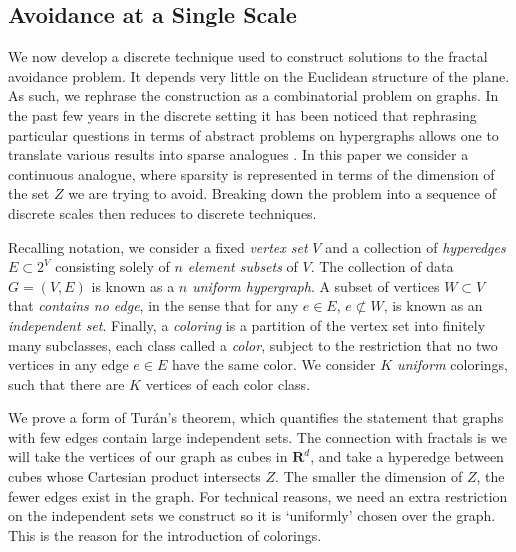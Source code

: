 \documentclass{article}
\theoremstyle{plain}
\theoremstyle{plain}
\begin{document}
\begin{multicols}{2}
\section{Avoidance at a Single Scale}

We now develop a discrete technique used to construct solutions to the fractal avoidance problem. It depends very little on the Euclidean structure of the plane. As such, we rephrase the construction as a combinatorial problem on graphs. In the past few years in the discrete setting it has been noticed that rephrasing particular questions in terms of abstract problems on hypergraphs allows one to translate various results into sparse analogues \cite{BaloghMorrisSamotij}. In this paper we consider a continuous analogue, where sparsity is represented in terms of the dimension of the set $Z$ we are trying to avoid. Breaking down the problem into a sequence of discrete scales then reduces to discrete techniques.


Recalling notation, we consider a fixed {\it vertex set} $V$ and a collection of {\it hyperedges} $E \subset 2^V$ consisting solely of {\it $n$ element subsets} of $V$. The collection of data $G = (V,E)$ is known as a {\it $n$ uniform hypergraph}. A subset of vertices $W \subset V$ that {\it contains no edge}, in the sense that for any $e \in E$, $e \not \subset W$, is known as an {\it independent set}. Finally, a {\it coloring} is a partition of the vertex set into finitely many subclasses, each class called a {\it color}, subject to the restriction that no two vertices in any edge $e \in E$ have the same color. We consider {\it $K$ uniform} colorings, such that there are $K$ vertices of each color class.

We prove a form of Tur\'{a}n's theorem, which quantifies the statement that graphs with few edges contain large independent sets. The connection with fractals is we will take the vertices of our graph as cubes in $\mathbf{R}^d$, and take a hyperedge between cubes whose Cartesian product intersects $Z$. The smaller the dimension of $Z$, the fewer edges exist in the graph. For technical reasons, we need an extra restriction on the independent sets we construct so it is `uniformly' chosen over the graph. This is the reason for the introduction of colorings.


\end{multicols}
\end{document}
